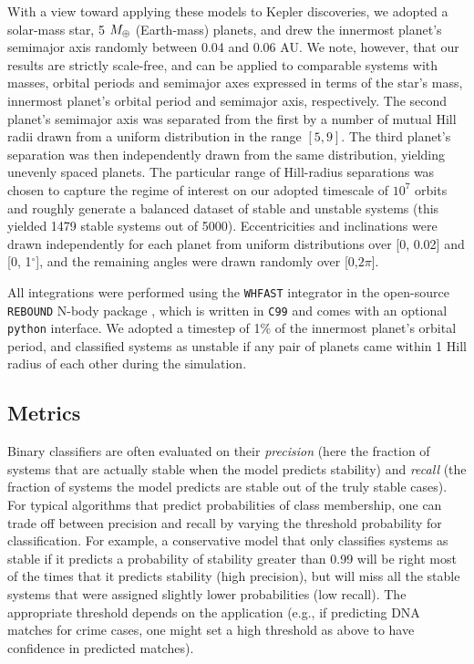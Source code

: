 With a view toward applying these models to Kepler discoveries, we adopted a solar-mass star, 5 $M_\oplus$ (Earth-mass) planets, and drew the innermost planet's semimajor axis randomly between 0.04 and 0.06 AU.
We note, however, that our results are strictly scale-free, and can be applied to comparable systems with masses, orbital periods and semimajor axes expressed in terms of the star's mass, innermost planet's orbital period and semimajor axis, respectively.
The second planet's semimajor axis was separated from the first by a number of mutual Hill radii drawn from a uniform distribution in the range $[5,9]$.  
The third planet's separation was then independently drawn from the same distribution, yielding unevenly spaced planets.
The particular range of Hill-radius separations was chosen to capture the regime of interest on our adopted timescale of $10^7$ orbits and roughly generate a balanced dataset of stable and unstable systems (this yielded 1479 stable systems out of 5000).
Eccentricities and inclinations were drawn independently for each planet from uniform distributions over [0, 0.02] and [0, 1$^\circ$], and the remaining angles were drawn randomly over [0,$2\pi$].

All integrations were performed using the {\sc \tt WHFAST} integrator \citep{Rein2015b} in the open-source {\sc \tt REBOUND} N-body package \citep{Rein2012}, which is written in \texttt{C99} and comes with an optional \texttt{python} interface.
We adopted a timestep of 1\% of the innermost planet's orbital period, and classified systems as unstable if any pair of planets came within 1 Hill radius of each other during the simulation.

\subsection{Metrics} \label{metrics}
Binary classifiers are often evaluated on their {\it precision} (here the fraction of systems that are actually stable when the model predicts stability) and {\it recall} (the fraction of systems the model predicts are stable out of the truly stable cases).  
For typical algorithms that predict probabilities of class membership, one can trade off between precision and recall by varying the threshold probability for classification.
For example, a conservative model that only classifies systems as stable if it predicts a probability of stability greater than 0.99 will be right most of the times that it predicts stability (high precision), but will miss all the stable systems that were assigned slightly lower probabilities (low recall).
The appropriate threshold depends on the application (e.g., if predicting DNA matches for crime cases, one might set a high threshold as above to have confidence in predicted matches).

